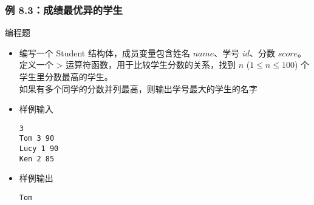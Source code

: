 
\begin{frame}[fragile]
    \frametitle{例 8.3：成绩最优异的学生}

     {
        
    } {
        \begin{exampleblock}{编程题}
            \begin{itemize}
                \item 编写一个 Student 结构体，成员变量包含姓名 $name$、学号 $id$、分数 $score$。
                定义一个 > 运算符函数，用于比较学生分数的关系，找到 $n$ ($1 \leq n \leq 100$) 个学生里分数最高的学生。\\
                如果有多个同学的分数并列最高，则输出学号最大的学生的名字

                \item 样例输入
    
                    \lstinline|3|\\
                    \lstinline|Tom 3 90|\\
                    \lstinline|Lucy 1 90|\\
                    \lstinline|Ken 2 85|

                \item 样例输出
                
                    \lstinline|Tom|
    
            \end{itemize}
        \end{exampleblock}
    }

\end{frame}

